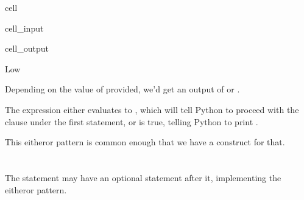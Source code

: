 \documentclass[letterpaper,10pt,english]{jupyterBook}
\begin{document}
\begin{sphinxuseclass}{cell}\begin{sphinxVerbatimInput}

\begin{sphinxuseclass}{cell_input}
\begin{sphinxVerbatim}[commandchars=\\\{\}]
  
   
   
\end{sphinxVerbatim}

\end{sphinxuseclass}\end{sphinxVerbatimInput}
\begin{sphinxVerbatimOutput}

\begin{sphinxuseclass}{cell_output}
\begin{sphinxVerbatim}[commandchars=\\\{\}]
Low
\end{sphinxVerbatim}

\end{sphinxuseclass}\end{sphinxVerbatimOutput}

\end{sphinxuseclass}
\sphinxAtStartPar
Depending on the value of  provided, we’d get an output of  or .

\sphinxAtStartPar
The expression  either evaluates to , which will tell Python to proceed with the clause under the first  statement, or  is true, telling Python to print .

\sphinxAtStartPar
This either\sphinxhyphen{}or pattern is common enough that we have a construct for that.


\section{}
\label{\detokenize{conditionals:else}}
\sphinxAtStartPar
The  statement may have an optional  statement after it, implementing the either\sphinxhyphen{}or pattern.
\end{document}
